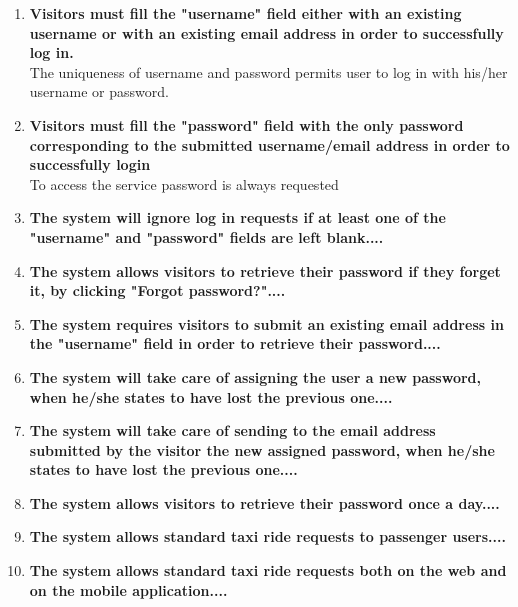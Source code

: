 \begin{enumerate}
	\item \textbf{Visitors must fill the "username" field either with an existing username
		or with an existing email address in order to successfully log in.}\\
	The uniqueness of username and password permits user to log in with his/her username or password.
	
	\item \textbf{Visitors must fill the "password" field with the only password corresponding to the submitted username/email address in order to successfully login}\\
	To access the service password is always requested
	
	\item \textbf{The system will ignore log in requests if at least one of the "username" and "password" fields are left blank....}\\
	
	
	\item \textbf{The system allows visitors to retrieve their password if they forget it, by
		clicking "Forgot password?"....}\\
	
	\item \textbf{The system requires visitors to submit an existing email address in the
		"username" field in order to retrieve their password....}\\
	
	\item \textbf{The system will take care of assigning the user a new password, when
		he/she states to have lost the previous one....}\\
	
	\item \textbf{The system will take care of sending to the email address submitted by
		the visitor the new assigned password, when he/she states to have lost the
		previous one....}\\
	
	\item \textbf{The system allows visitors to retrieve their password once a day....}\\
	
	\item \textbf{The system allows standard taxi ride requests to passenger users....}\\
	
	\item \textbf{The system allows standard taxi ride requests both on the web and on the
		mobile application....}\\
	

\end{enumerate}
